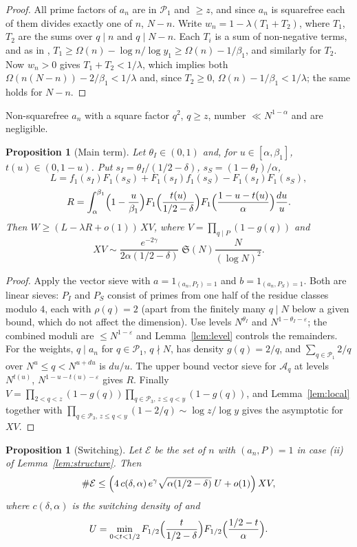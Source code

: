 \documentclass[11pt]{amsart}
\newtheorem{proposition}[theorem]{Proposition}
\theoremstyle{remark}
\newcommand{\cA}{\mathcal{A}}
\newcommand{\cE}{\mathcal{E}}
\newcommand{\cP}{\mathcal{P}}
\newcommand{\Sg}{\mathfrak{S}}
\begin{document}
\begin{proof}
All prime factors of $a_n$ are in $\cP_1$ and $\ge z$, and since $a_n$ is squarefree each of them divides
exactly one of $n$, $N-n$. Write $w_n=1-\lambda(T_1+T_2)$, where $T_1$, $T_2$ are the sums over $q\mid n$ and
$q\mid N-n$. Each $T_i$ is a sum of non-negative terms, and as in \cite[Lemma~3.2]{Chen1},
$T_1\ge\Omega(n)-\log n/\log y_1\ge\Omega(n)-1/\beta_1$, and similarly for $T_2$. Now $w_n>0$ gives
$T_1+T_2<1/\lambda$, which implies both $\Omega(n(N-n))-2/\beta_1<1/\lambda$ and, since $T_2\ge0$,
$\Omega(n)-1/\beta_1<1/\lambda$; the same holds for $N-n$.
\end{proof}

Non-squarefree $a_n$ with a square factor $q^2$, $q\ge z$, number $\ll N^{1-\alpha}$ and are negligible.

\begin{proposition}[Main term]\label{prop:W}
Let $\theta_I\in(0,1)$ and, for $u\in[\alpha,\beta_1]$, $t(u)\in(0,1-u)$. Put $s_I=\theta_I/(1/2-\delta)$,
$s_S=(1-\theta_I)/\alpha$,
\[
L=f_1(s_I)F_1(s_S)+F_1(s_I)f_1(s_S)-F_1(s_I)F_1(s_S),
\]
\[
R=\int_\alpha^{\beta_1}\Bigl(1-\frac u{\beta_1}\Bigr)F_1\Bigl(\frac{t(u)}{1/2-\delta}\Bigr)
F_1\Bigl(\frac{1-u-t(u)}{\alpha}\Bigr)\frac{du}{u}.
\]
Then $W\ge(L-\lambda R+o(1))\,XV$, where $V=\prod_{q\mid P}(1-g(q))$ and
\[
XV\sim\frac{e^{-2\gamma}}{2\alpha(1/2-\delta)}\;\Sg(N)\frac{N}{(\log N)^2}.
\]
\end{proposition}

\begin{proof}
Apply the vector sieve with $a=1_{(a_n,P_I)=1}$ and $b=1_{(a_n,P_S)=1}$. Both are linear sieves:
$P_I$ and $P_S$ consist of primes from one half of the residue classes modulo $4$, each with
$\rho(q)=2$ (apart from the finitely many $q\mid N$ below a given bound, which do not affect the dimension).
Use levels $N^{\theta_I}$ and $N^{1-\theta_I-\varepsilon}$; the combined moduli are $\le N^{1-\varepsilon}$
and Lemma~\ref{lem:level} controls the remainders. For the weights, $q\mid a_n$ for $q\in\cP_1$, $q\nmid N$,
has density $g(q)=2/q$, and $\sum_{q\in\cP_1}2/q$ over $N^u\le q<N^{u+du}$ is $du/u$. The upper bound vector
sieve for $\cA_q$ at levels $N^{t(u)}$, $N^{1-u-t(u)-\varepsilon}$ gives $R$. Finally
$V=\prod_{2<q<z}(1-g(q))\prod_{q\in\cP_3,\,z\le q<y}(1-g(q))$, and Lemma~\ref{lem:local} together with
$\prod_{q\in\cP_3,\,z\le q<y}(1-2/q)\sim\log z/\log y$ gives the asymptotic for $XV$.
\end{proof}

\begin{proposition}[Switching]\label{prop:switch}
Let $\cE$ be the set of $n$ with $(a_n,P)=1$ in case (ii) of Lemma~\ref{lem:structure}. Then
\[
\#\cE\le\Bigl(4\,c(\delta,\alpha)\,e^{\gamma}\sqrt{\alpha(1/2-\delta)}\;U+o(1)\Bigr)\,XV,
\]
where $c(\delta,\alpha)$ is the switching density of \cite[Prop.~4.1]{Chen1} and
\[
U=\min_{0<t<1/2}F_{1/2}\Bigl(\frac{t}{1/2-\delta}\Bigr)F_{1/2}\Bigl(\frac{1/2-t}{\alpha}\Bigr).
\]
\end{proposition}
\end{document}
